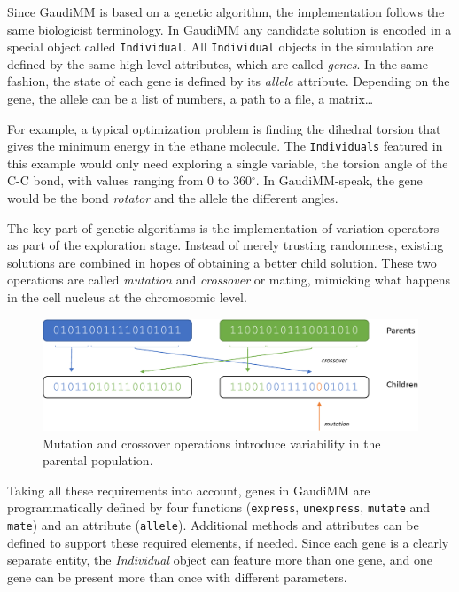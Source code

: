 Since GaudiMM is based on a genetic algorithm, the implementation follows the same biologicist terminology. In GaudiMM any candidate solution is encoded in a special object called \texttt{Individual}. All \texttt{Individual} objects in the simulation are defined by the same high-level attributes, which are called \textit{genes}. In the same fashion, the state of each gene is defined by its \textit{allele} attribute. Depending on the gene, the allele can be a list of numbers, a path to a file, a matrix\ldots

For example, a typical optimization problem is finding the dihedral torsion that gives the minimum energy in the ethane molecule. The \texttt{Individuals} featured in this example would only need exploring a single variable, the torsion angle of the C-C bond, with values ranging from 0 to 360$^\circ$. In GaudiMM-speak, the gene would be the bond \textit{rotator} and the allele the different angles.

The key part of genetic algorithms is the implementation of variation operators as part of the exploration stage. Instead of merely trusting randomness, existing solutions are combined in hopes of obtaining a better child solution. These two operations are called \textit{mutation} and \textit{crossover} or mating, mimicking what happens in the cell nucleus at the chromosomic level.


\begin{figure}[H] %
	\includegraphics[width=\textwidth]{./figures/04/ga-crossover-mut-crop.pdf}
	\caption[Mutation and crossover]{Mutation and crossover operations introduce variability in the parental population.}
	\label{fig:cxmut}
\end{figure}

Taking all these requirements into account, genes in GaudiMM are programmatically defined by four functions (\texttt{express}, \texttt{unexpress}, \texttt{mutate} and \texttt{mate}) and an attribute (\texttt{allele}). Additional methods and attributes can be defined to support these required elements, if needed. Since each gene is a clearly separate entity, the \textit{Individual} object can feature more than one gene, and one gene can be present more than once with different parameters.

